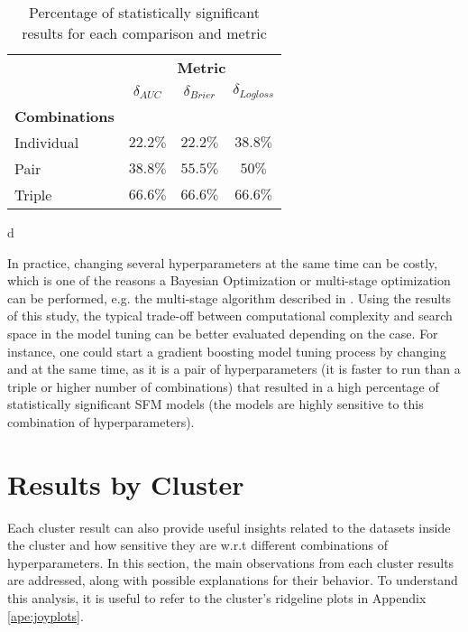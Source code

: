 \begin{table}[H]
    \centering
    \begin{tabular}{l|lcc}
              & \multicolumn{3}{c}{\textbf{Metric}}                                 \\
              & \multicolumn{1}{c}{$\delta_{AUC}$} &  \multicolumn{1}{c}{$\delta_{Brier}$} &  \multicolumn{1}{c}{$\delta_{Logloss}$} \\
    \textbf{Combinations} &          & \multicolumn{1}{l}{} & \multicolumn{1}{l}{} \\
    \midrule
    Individual & $22.2\%$ & $22.2\%$ & $38.8\%$\\
    Pair       & $38.8\%$ & $55.5\%$ & $50\%$\\
    Triple     & $66.6\%$ & $66.6\%$ & $66.6\%$
    \end{tabular}
    \caption{Percentage of statistically significant results for each comparison and metric}
    \label{table:stats-combination}d
\end{table}

In practice, changing several hyperparameters at the same time can be costly, which is one of the reasons a Bayesian Optimization or multi-stage optimization can be performed, e.g. the multi-stage algorithm described in \cite{wang-etal-2015-efficient}. Using the results of this study, the typical trade-off between computational complexity and search space in the model tuning can be better evaluated depending on the case. For instance, one could start a gradient boosting model tuning process by changing  and  at the same time, as it is a pair of hyperparameters (it is faster to run than a triple or higher number of combinations) that resulted in a high percentage of statistically significant SFM models (the models are highly sensitive to this combination of hyperparameters).

    
\section{Results by Cluster}

Each cluster result can also provide useful insights related to the datasets inside the cluster and how sensitive they are w.r.t different combinations of hyperparameters. In this section, the main observations from each cluster results are addressed, along with possible explanations for their behavior. To understand this analysis, it is useful to refer to the cluster's ridgeline plots in Appendix \ref{ape:joyplots}.

